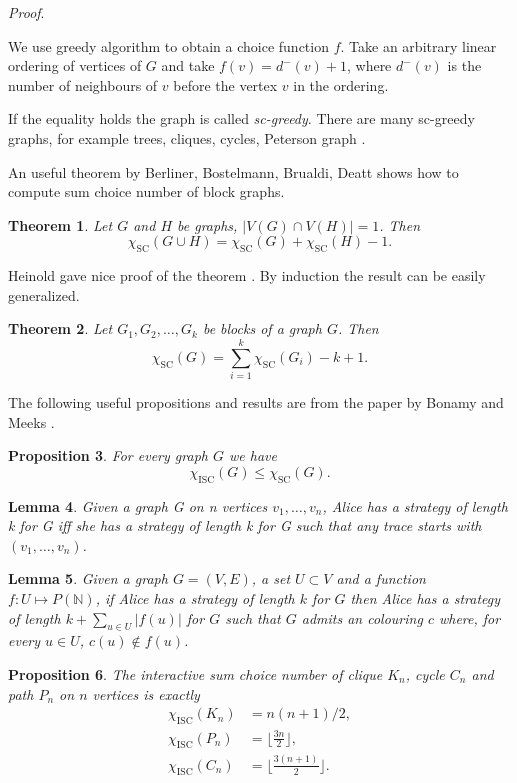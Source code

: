 \documentclass[11pt,a4paper]{article}
\theoremstyle{plain}
\newtheorem{thm}{Theorem}[section]
\newtheorem{lem}[thm]{Lemma}
\newtheorem{prop}[thm]{Proposition}
\newenvironment{pf}{
  \par\medskip\noindent
  \textit{Proof}.
}{
\newline
\rightline{$\square$}  %
}
\theoremstyle{definition}
\theoremstyle{remark}
\newcommand{\scn}{\chi_\text{SC}}
\newcommand{\iscn}{\chi_\text{ISC}}
\begin{document}
\begin{pf}
We use greedy algorithm to obtain a choice function $f$. Take an arbitrary linear ordering of vertices of $G$ and take $f(v)=d^-(v)+1$, where $d^-(v)$ is the number of neighbours of $v$ before the vertex $v$ in the ordering.
\end{pf}

If the equality holds the graph is called \emph{sc-greedy}. There are many sc-greedy graphs, for example trees, cliques, cycles, Peterson graph \cite{heinold2006}.

An useful theorem by Berliner, Bostelmann, Brualdi, Deatt shows how to compute sum choice number of block graphs.

\begin{thm}
Let $G$ and $H$ be graphs, $|V(G)\cap V(H)|=1$. Then
$$\scn(G\cup H) = \scn(G)+\scn(H)-1.$$
\end{thm}

Heinold gave nice proof of the theorem \cite{heinold2011}. By induction the result can be easily generalized.

\begin{thm}\label{thm:bbbd}
Let $G_1,G_2,\ldots,G_k$ be blocks of a graph $G$. Then
$$\scn(G) = \sum_{i=1}^k \scn(G_i) - k + 1.$$
\end{thm}

The following useful propositions and results are from the paper by Bonamy and Meeks \cite{iscn}.

\begin{prop}
For every graph $G$ we have
$$\iscn(G)\leq \scn(G).$$
\end{prop}

\begin{lem}
Given a graph G on n vertices $v_1, \ldots, v_n$, Alice has a strategy of
length k for G iff she has a strategy of length k for G such that any trace starts with
$(v_1, \ldots, v_n)$.
\end{lem}

\begin{lem}\label{thm:difcolor}
Given a graph $G = (V, E)$, a set $U \subset V$ and a function $f : U \mapsto P(\mathbb{N})$, if
Alice has a strategy of length $k$ for $G$ then Alice has a strategy of length $k + \sum_{u\in U} |f(u)|$ for $G$ such that $G$ admits an colouring $c$ where, for every $u\in U$, $c(u) \notin f(u)$.
\end{lem}


\begin{prop}\label{thm:odhady} The interactive sum choice number of clique $K_n$, cycle $C_n$ and path $P_n$ on $n$ vertices is exactly
\begin{align*}
\iscn(K_n) &= n(n+1)/2, \\
\iscn(P_n) &= \lfloor{\frac{3n}{2}}\rfloor, \\
\iscn(C_n) &= \lfloor{\frac{3(n+1)}{2}}\rfloor.
\end{align*}
\end{prop}
\end{document}
